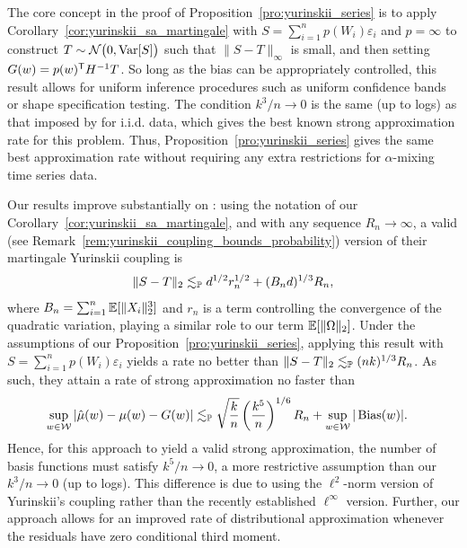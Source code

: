 The core concept in the proof of Proposition~\ref{pro:yurinskii_series} is to
apply
Corollary~\ref{cor:yurinskii_sa_martingale} with
$S = \sum_{i=1}^n p(W_i) \varepsilon_i$
and $p=\infty$ to construct $T \sim \cN\big(0, \Var[S]\big)$ such that
$\|S - T \|_\infty$ is small, and then setting $G(w) = p(w)^\T H^{-1} T$. So
long as the bias can be appropriately controlled, this result allows for
uniform inference procedures such as uniform confidence bands or shape
specification testing. The condition $k^3 / n \to 0$ is the same (up to logs)
as that imposed by \citet{cattaneo2020large} for i.i.d. data, which gives the
best known strong approximation rate for this problem. Thus,
Proposition~\ref{pro:yurinskii_series} gives the same best approximation rate
without
requiring any extra restrictions for $\alpha$-mixing time series data.

Our results improve substantially on \citet[Theorem~1]{li2020uniform}: using
the notation of our Corollary~\ref{cor:yurinskii_sa_martingale}, and with any
sequence
$R_n \to \infty$, a valid (see
Remark~\ref{rem:yurinskii_coupling_bounds_probability})
version of their martingale Yurinskii coupling is
%
\begin{align*}
  \|S-T\|_2
  \lesssim_\P
  d^{1/2} r^{1/2}_n
  + (B_n d)^{1/3} R_n,
\end{align*}
%
where $B_n = \sum_{i=1}^n \E[\|X_i\|_2^3]$ and $r_n$ is a term controlling the
convergence of the quadratic variation, playing a similar role to our
term $\E[\|\Omega\|_2]$. Under the assumptions of our
Proposition~\ref{pro:yurinskii_series}, applying this
result with $S = \sum_{i=1}^n p(W_i) \varepsilon_i$ yields a rate no better
than $\|S-T\|_2 \lesssim_\P (n k)^{1/3} R_n$. As such, they attain a rate of
strong approximation no faster than
%
\begin{align*}
  \sup_{w \in \cW}
  \left| \hat\mu(w) - \mu(w) - G(w) \right|
  &\lesssim_\P
  \sqrt{\frac{k}{n}}
  \left( \frac{k^5}{n} \right)^{1/6} R_n
  + \sup_{w \in \cW} |\Bias(w)|.
\end{align*}
%
Hence, for this approach to yield a valid strong approximation, the number of
basis functions must satisfy $k^5/n \to 0$, a more restrictive assumption than
our $k^3 / n \to 0$ (up to logs). This difference is due to
\citet{li2020uniform} using the $\ell^2$-norm version of Yurinskii's coupling
rather than the recently established $\ell^\infty$ version. Further,
our approach allows for an improved rate of distributional approximation
whenever the residuals have zero conditional third moment.

